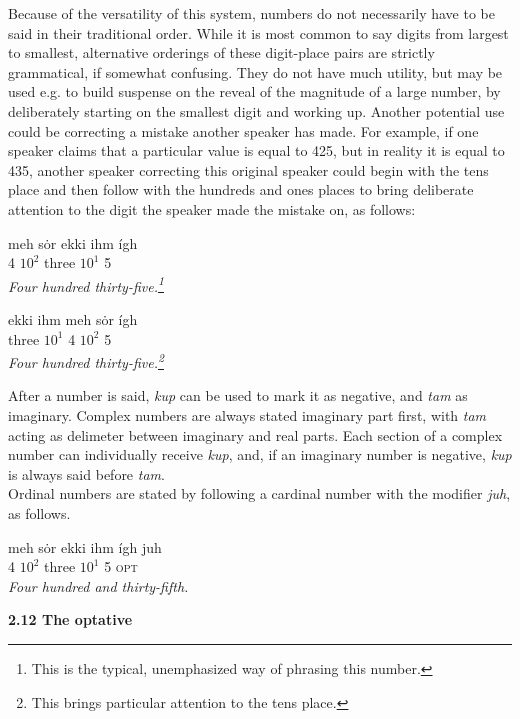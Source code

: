 \documentclass{article}[10pt]
\begin{document}
Because of the versatility of this system, numbers do not necessarily have to be said in their traditional order. While it is most common to say digits from largest to smallest, alternative orderings of these digit-place pairs are strictly grammatical, if somewhat confusing. They do not have much utility, but may be used e.g. to build suspense on the reveal of the magnitude of a large number, by deliberately starting on the smallest digit and working up. Another potential use could be correcting a mistake another speaker has made. For example, if one speaker claims that a particular value is equal to 425, but in reality it is equal to 435, another speaker correcting this original speaker could begin with the tens place and then follow with the hundreds and ones places to bring deliberate attention to the digit the speaker made the mistake on, as follows:

\begin{exe}
\ex
\gll meh s\.{o}r ekki ihm \'{i}gh\\
4 $10^2$ three $10^1$ 5\\
\trans \emph{Four hundred thirty-five.\emph{\footnote{This is the typical, unemphasized way of phrasing this number.}}}

\ex
\gll ekki ihm meh s\.{o}r \'{i}gh\\
three $10^1$ 4 $10^2$ 5\\
\trans \emph{Four hundred thirty-five.\emph{\footnote{This brings particular attention to the tens place.}}}
\end{exe}

After a number is said, \emph{kup} can be used to mark it as negative, and \emph{tam} as imaginary. Complex numbers are always stated imaginary part first, with \emph{tam} acting as delimeter between imaginary and real parts. Each section of a complex number can individually receive \emph{kup}, and, if an imaginary number is negative, \emph{kup} is always said before \emph{tam}.\\

Ordinal numbers are stated by following a cardinal number with the modifier \emph{juh}, as follows.

\begin{exe}
\ex
\gll meh s\.{o}r ekki ihm \'{i}gh juh\\
4 $10^2$ three $10^1$ 5 \textsc{opt}\\
\trans \emph{Four hundred and thirty-fifth.}
\end{exe}

{\bf 2.12 The optative}
\end{document}
